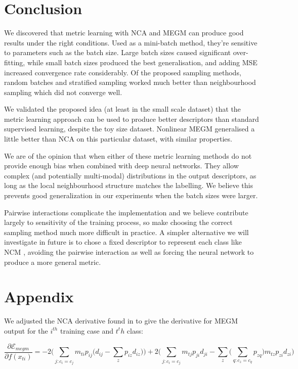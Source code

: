 \section {Conclusion}

We discovered that metric learning with \gls{NCA} and \gls{MEGM} can produce good results under the right conditions. Used as a mini-batch method, they're sensitive to parameters such as the batch size. Large batch sizes caused significant over-fitting,
while small batch sizes produced the best generalisation, and adding \gls{MSE} increased convergence rate considerably. Of the proposed sampling methods, random batches and stratified sampling worked much better than neighbourhood sampling which did not converge well.


We validated the proposed idea (at least in the small scale dataset) that the metric learning approach can be used to produce better descriptors than
standard supervised learning, despite the toy size dataset. Nonlinear \gls{MEGM} generalised a little better than NCA on this particular dataset, with similar
properties.

We are of the opinion that when either of these metric learning methods do not provide enough bias when combined with deep neural networks. They allow
complex (and potentially multi-modal) distributions in the output descriptors, as long as the local neighbourhood structure matches the labelling. We believe
this prevents good generalization in our experiments when the batch sizes were larger.

Pairwise interactions complicate the implementation and we believe contribute largely to sensitivity of the training process, so make choosing the correct sampling method much more difficult in practice. A simpler alternative we will investigate in future is to chose a fixed descriptor to represent each class like \gls{NCM} \cite {Mensink2012}, avoiding the pairwise interaction as well as forcing the neural network to produce a more general metric.



\section{Appendix}
\label{sec:appendix}

 We adjusted the \gls{NCA} derivative found in \cite {Salakhutdinov2007a} to give the derivative for \gls{MEGM} output for the $ i^{th} $ training case and $ t^th $ class:


\begin{equation}
\label{eq:megm_grad}
\frac{\partial \mathcal{E}_{megm}}{\partial f(x_{ti})} = 
  -2 \bigg( \sum_{j:c_i = c_j}  m_{ti} {p_{ij} \Big( d_{ij} - \sum_z{p_{iz}d_{iz}} \Big) } \bigg) 
  +2 \bigg( \sum_{j:c_i = c_j} m_{tj}{p_{ji}d_{ji} - \sum_z{\Big( \sum_{q:c_z = c_q}{p_{zq}} \Big) m_{tz}p_{zi}d_{zi}   }} \bigg)
\end{equation}

